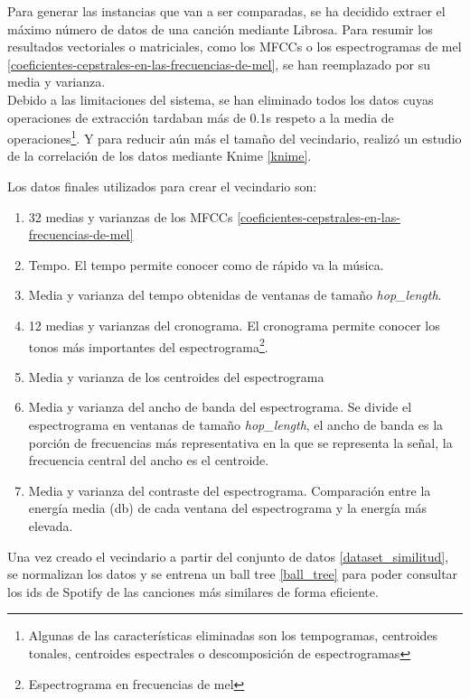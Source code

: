Para generar las instancias que van a ser comparadas, se ha decidido extraer el máximo número de datos de una canción mediante Librosa. Para resumir los resultados vectoriales o matriciales, como los MFCCs o los espectrogramas de mel \ref{coeficientes-cepstrales-en-las-frecuencias-de-mel}, se han reemplazado por su media y varianza.\\
Debido a las limitaciones del sistema, se han eliminado todos los datos cuyas operaciones de extracción tardaban más de 0.1s respeto a la media de operaciones\footnote{Algunas de las características eliminadas son los tempogramas, centroides tonales, centroides espectrales o descomposición de espectrogramas}. Y para reducir aún más el tamaño del vecindario, realizó un estudio de la correlación de los datos mediante Knime \ref{knime}. 

Los datos finales utilizados para crear el vecindario son:
\begin{enumerate}
    \item 32 medias y varianzas de los  MFCCs \ref{coeficientes-cepstrales-en-las-frecuencias-de-mel}
    \item Tempo. El tempo permite conocer como de rápido va la música.
    \item Media y varianza del tempo obtenidas de ventanas de tamaño \textit{hop\_length}.
    \item 12 medias y varianzas del cronograma. El cronograma permite conocer los tonos más importantes del espectrograma\footnote{Espectrograma en frecuencias de mel}.
    \item Media y varianza de los centroides del espectrograma
    \item Media y varianza del ancho de banda del espectrograma. Se divide el espectrograma en ventanas de tamaño \textit{hop\_length}, el ancho de banda es la porción de frecuencias más representativa en la que se representa la señal, la frecuencia central del ancho es el centroide.
    \item Media y varianza del contraste del espectrograma. Comparación entre la energía media (db) de cada ventana del espectrograma y la energía más elevada.
\end{enumerate}

Una vez creado el vecindario a partir del conjunto de datos \ref{dataset_similitud}, se normalizan los datos y se entrena un ball tree \ref{ball_tree} para poder consultar los ids de Spotify de las canciones más similares de forma eficiente.


